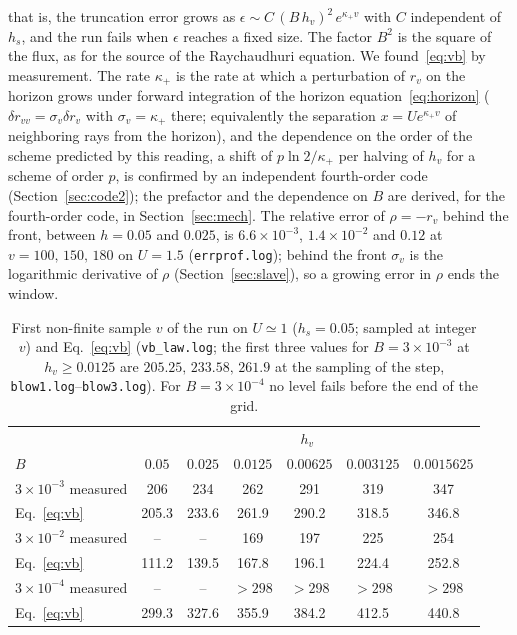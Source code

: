 \documentclass[11pt]{article}
\begin{document}
that is, the truncation error grows as $\epsilon\sim C\,(B\,h_v)^{2}\,e^{\kappa_+v}$ with $C$ independent of $h_s$, and the run fails when $\epsilon$ reaches a fixed size. The factor $B^{2}$ is the square of the flux, as for the source of the Raychaudhuri equation. We found~\eqref{eq:vb} by measurement. The rate $\kappa_+$ is the rate at which a perturbation of $r_v$ on the horizon grows under forward integration of the horizon equation~\eqref{eq:horizon} ($\delta r_{vv}=\sigma_v\delta r_v$ with $\sigma_v=\kappa_+$ there; equivalently the separation $x=Ue^{\kappa_+v}$ of neighboring rays from the horizon), and the dependence on the order of the scheme predicted by this reading, a shift of $p\ln2/\kappa_+$ per halving of $h_v$ for a scheme of order $p$, is confirmed by an independent fourth-order code (Section~\ref{sec:code2}); the prefactor and the dependence on $B$ are derived, for the fourth-order code, in Section~\ref{sec:mech}. The relative error of $\rho=-r_v$ behind the front, between $h=0.05$ and $0.025$, is $6.6\times10^{-3}$, $1.4\times10^{-2}$ and $0.12$ at $v=100,\,150,\,180$ on $U=1.5$ (\texttt{errprof.log}); behind the front $\sigma_v$ is the logarithmic derivative of $\rho$ (Section~\ref{sec:slave}), so a growing error in $\rho$ ends the window.

\begin{table}[ht]\centering\small
\caption{First non-finite sample $v$ of the run on $U\simeq1$ ($h_s=0.05$; sampled at integer $v$) and Eq.~\eqref{eq:vb} (\texttt{vb\_law.log}; the first three values for $B=3\times10^{-3}$ at $h_v\ge0.0125$ are $205.25,\,233.58,\,261.9$ at the sampling of the step, \texttt{blow1.log}--\texttt{blow3.log}). For $B=3\times10^{-4}$ no level fails before the end of the grid.}\label{tab:vb}
\begin{tabular}{lcccccc}
\toprule
 & \multicolumn{6}{c}{$h_v$}\\
$B$ & $0.05$ & $0.025$ & $0.0125$ & $0.00625$ & $0.003125$ & $0.0015625$\\\midrule
$3\times10^{-3}$ measured & 206 & 234 & 262 & 291 & 319 & 347\\
Eq.~\eqref{eq:vb} & 205.3 & 233.6 & 261.9 & 290.2 & 318.5 & 346.8\\
$3\times10^{-2}$ measured & -- & -- & 169 & 197 & 225 & 254\\
Eq.~\eqref{eq:vb} & 111.2 & 139.5 & 167.8 & 196.1 & 224.4 & 252.8\\
$3\times10^{-4}$ measured & -- & -- & $>298$ & $>298$ & $>298$ & $>298$\\
Eq.~\eqref{eq:vb} & 299.3 & 327.6 & 355.9 & 384.2 & 412.5 & 440.8\\\bottomrule
\end{tabular}
\end{table}
\end{document}
